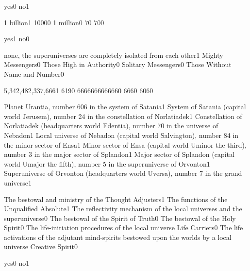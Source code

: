 {yes}{0}
{no}{1}
\qstop

{1 billion}{1}
{1000}{0}
{1 million}{0}
{7}{0}
{70}{0}
\qstop

{yes}{1}
{no}{0}
\qstop

{none, the superuniverses are completely isolated from each other}{1}
{Mighty Messengers}{0}
{Those High in Authority}{0}
{Solitary Messengers}{0}
{Those Without Name and Number}{0}
\qstop

{5,342,482,337,666}{1}
{619}{0}
{666666666666}{0}
{666}{0}
{606}{0}
\qstop

{Planet Urantia, number 606 in the system of Satania}{1}
{System of Satania (capital world Jerusem), number 24 in the constellation of Norlatiadek}{1}
{Constellation of Norlatiadek (headquarters world Edentia), number 70 in the universe of Nebadon}{1}
{Local universe of Nebadon (capital world Salvington), number 84 in the minor sector of Ensa}{1}
{Minor sector of Ensa (capital world Uminor the third), number 3 in the major sector of Splandon}{1}
{Major sector of Splandon (capital world Umajor the fifth), number 5 in the superuniverse of Orvonton}{1}
{Superuniverse of Orvonton (headquarters world Uversa), number 7 in the grand universe}{1}
\qstop

{The bestowal and ministry of the Thought Adjusters}{1}
{The functions of the Unqualified Absolute}{1}
{The reflectivity mechanism of the local universes and the superuniverse}{0}
{The bestowal of the Spirit of Truth}{0}
{The bestowal of the Holy Spirit}{0}
{The life-initiation procedures of the local universe Life Carriers}{0}
{The life activations of the adjutant mind-spirits bestowed upon the worlds by a local universe Creative Spirit}{0}
\qstop

{yes}{0}
{no}{1}
\qstop

